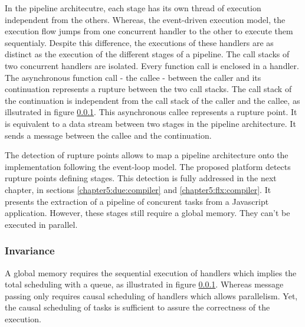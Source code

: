 In the pipeline architecutre, each stage has its own thread of execution independent from the others.
Whereas, the event-driven execution model, the execution flow jumps from one concurrent handler to the other to execute them sequentialy.
Despite this difference, the executions of these handlers are as distinct as the execution of the different stages of a pipeline.
The call stacks of two concurrent handlers are isolated.
Every function call is enclosed in a handler.
The asynchronous function call - the callee - between the caller and its continuation represents a rupture between the two call stacks.
The call stack of the continuation is independent from the call stack of the caller and the callee, as illsutrated in figure \ref{}.
This asynchronous callee represents a rupture point.
It is equivalent to a data stream between two stages in the pipeline architecture.
It sends a message between the callee and the continuation.

The detection of rupture points allows to map a pipeline architecture onto the implementation following the event-loop model.
The proposed platform detects rupture points defining stages. %
This detection is fully addressed in the next chapter, in sections \ref{chapter5:due:compiler} and \ref{chapter5:flx:compiler}.
It presents the extraction of a pipeline of concurent tasks from a Javascript application.
However, these stages still require a global memory.
They can't be executed in parallel.

\subsubsection{Invariance}


A global memory requires the sequential execution of handlers which implies the total scheduling with a queue, as illustrated in figure \ref{}.
Whereas message passing only requires causal scheduling of handlers which allows parallelism.
Yet, the causal scheduling of tasks is sufficient to assure the correctness of the execution.

